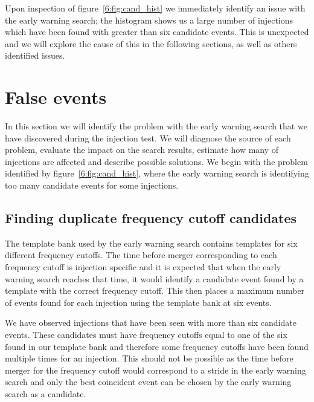 Upon inspection of figure~\ref{6:fig:cand_hist} we immediately identify an issue with the early warning search; the histogram shows us a large number of injections which have been found with greater than six candidate events. This is unexpected and we will explore the cause of this in the following sections, as well as others identified issues.

\section{\label{6:sec:false-problems}False events}

In this section we will identify the problem with the early warning search that we have discovered during the injection test. We will diagnose the source of each problem, evaluate the impact on the search results, estimate how many of injections are affected and describe possible solutions. We begin with the problem identified by figure~\ref{6:fig:cand_hist}, where the early warning search is identifying too many candidate events for some injections.

\subsection{\label{6:sec:duplicate-frequency-cands}Finding duplicate frequency cutoff candidates}


The template bank used by the early warning search contains templates for six different frequency cutoffs. The time before merger corresponding to each frequency cutoff is injection specific and it is expected that when the early warning search reaches that time, it would identify a candidate event found by a template with the correct frequency cutoff. This then places a maximum number of events found for each injection using the template bank at six events.

We have observed injections that have been seen with more than six candidate events. These candidates must have frequency cutoffs equal to one of the six found in our template bank and therefore some frequency cutoffs have been found multiple times for an injection. This should not be possible as the time before merger for the frequency cutoff would correspond to a stride in the early warning search and only the best coincident event can be chosen by the early warning search as a candidate.

